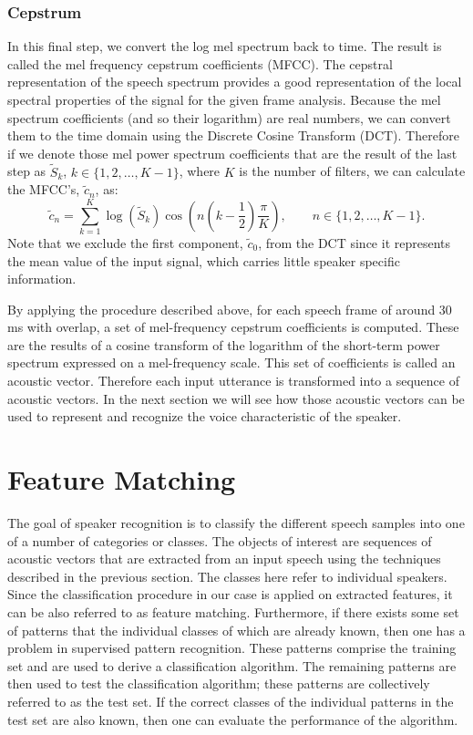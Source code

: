 \documentclass{article}
\begin{document}
\subsubsection{Cepstrum}
In this final step, we convert the log mel spectrum back to time.  The result is called the mel frequency cepstrum coefficients (MFCC).  The cepstral representation of the speech spectrum provides a good representation of the local spectral properties of the signal for the given frame analysis. Because the mel spectrum coefficients (and so their logarithm) are real numbers, we can convert them to the time domain using the Discrete Cosine Transform (DCT).  Therefore if we denote those mel power spectrum coefficients that are the result of the last step as $\tilde{S}_k$, $k\in\{1,2,\dots,K-1\}$, where $K$ is the number of filters, we can calculate the MFCC's, $\tilde{c}_n$, as: 
\begin{equation}
    \tilde{c}_n = \sum_{k=1}^K \log(\tilde{S}_k)\cos\left(n \left(k-\frac{1}{2}\right)\frac{\pi}{K}\right), \qquad n\in\{1,2,\dots,K-1\}.
\end{equation}
Note that we exclude the first component, $\tilde{c}_0$, from the DCT since it represents the mean value of the input signal, which carries little speaker specific information.

By applying the procedure described above, for each speech frame of around 30 ms with overlap, a set of mel-frequency cepstrum coefficients is computed.  These are the results of a cosine transform of the logarithm of the short-term power spectrum expressed on a mel-frequency scale.  This set of coefficients is called an acoustic vector.  Therefore each input utterance is transformed into a sequence of acoustic vectors. In the next section we will see how those acoustic vectors can be used to represent and recognize the voice characteristic of the speaker.

\section{Feature Matching}
The goal of speaker recognition is to classify the different speech samples into one of a number of categories or classes.  The objects of interest are sequences of acoustic vectors that are extracted from an input speech using the techniques described in the previous section.  The classes here refer to individual speakers.  Since the classification procedure in our case is applied on extracted features, it can be also referred to as feature matching. Furthermore, if there exists some set of patterns that the individual classes of which are already known, then one has a problem in supervised pattern recognition.  These patterns comprise the training set and are used to derive a classification algorithm.  The remaining patterns are then used to test the classification algorithm; these patterns are collectively referred to as the test set.  If the correct classes of the individual patterns in the test set are also known, then one can evaluate the performance of the algorithm.
\end{document}
